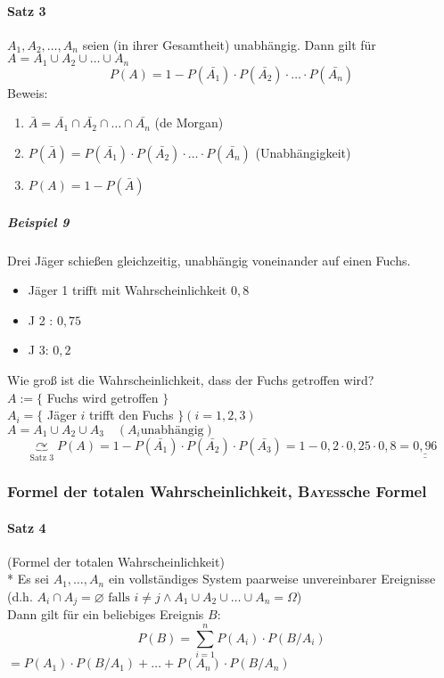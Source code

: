 \documentclass[a4paper]{scrartcl}
\begin{document}
\paragraph{Satz 3} $A_1,A_2,\dots,A_n$ seien (in ihrer Gesamtheit) unabhängig. Dann gilt für $A= A_1 \cup A_2 \cup \dots \cup A_n$
\[ P (A) = 1 - P(\bar{A_1}) \cdot P(\bar{A_2}) \cdot \dots \cdot P(\bar{A_n})\]
Beweis: \begin{enumerate}
\item $\bar{A} = \bar{A_1} \cap \bar{A_2} \cap \dots \cap \bar{A_n}$ (de Morgan)
\item $P(\bar{A}) = P(\bar{A_1}) \cdot P(\bar{A_2}) \cdot \dots \cdot P(\bar{A_n})$ (Unabhängigkeit)
\item $P(A) = 1 - P(\bar{A})$
\end{enumerate}

\subparagraph{Beispiel 9} Drei Jäger schießen gleichzeitig, unabhängig voneinander auf einen Fuchs.\\
\begin{itemize}
\item Jäger 1 trifft mit Wahrscheinlichkeit $0,8$
\item J 2 : $0,75$
\item J 3: $0,2$
\end{itemize}
Wie groß ist die Wahrscheinlichkeit, dass der Fuchs getroffen wird?\\
$A:=\{$ Fuchs wird getroffen $\}$\\
$A_i = \{$ Jäger $i$ trifft den Fuchs $\} (i=1,2,3)$\\
$A= A_1 \cup A_2 \cup A_3  \quad (A_i \text{unabhängig})$
\[ \underbrace{\curvearrowright}_{\text{Satz 3}} P(A) = 1 - P(\bar{A_1}) \cdot P(\bar{A_2}) \cdot P(\bar{A_3}) = 1 - 0,2 \cdot 0,25 \cdot 0,8 = \underline{\underline{0,96}} \]

\subsubsection{Formel der totalen Wahrscheinlichkeit, \textsc{Bayes}sche Formel}
\paragraph{Satz 4} (Formel der totalen Wahrscheinlichkeit)\\*
Es sei $A_1,\dots,A_n$ ein vollständiges System paarweise unvereinbarer Ereignisse (d.h. $A_i \cap A_j = \varnothing \text{ falls } i \neq j \wedge A_1 \cup A_2 \cup \dots \cup A_n = \Omega$)\\
Dann gilt für ein beliebiges Ereignis $B$:
\[ P(B) = \sum\limits_{i=1}^n P(A_i) \cdot P (B / A_i)\]
$= P(A_1) \cdot P(B / A_1 ) + \dots + P(A_n) \cdot P(B / A_n)$
\end{document}
